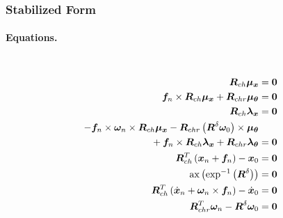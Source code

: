 \documentclass[10pt,fleqn,subeqn]{report}
\newcommand{\T}[1]{\bm{#1}}
\newcommand{\TT}[1]{\bm{#1}}
\begin{document}
\subsubsection{Stabilized Form}
\paragraph{Equations.} \
\begin{subequations}
\begin{align}
	\TT{R}_{ch} \T{\mu}_{\T{x}} &= \T{0} \\
%
	\T{f}_n \times \TT{R}_{ch} \T{\mu}_{\T{x}} + \TT{R}_{chr} \T{\mu}_{\T{\theta}} &= \T{0} \\
%
	\TT{R}_{ch} \T{\lambda}_{\T{x}} &= \T{0} \\
%
	-\T{f}_n \times \T{\omega}_n \times \TT{R}_{ch} \T{\mu}_{\T{x}}
	- \TT{R}_{chr} \plbr{\TT{R}^{\delta} \T{\omega}_0} \times \T{\mu}_{\T{\theta}} & \nonumber \\
	\mbox{} + \T{f}_n \times \TT{R}_{ch} \T{\lambda}_{\T{x}} + \TT{R}_{chr} \T{\lambda}_{\T{\theta}} &= \T{0} \\
%
	\TT{R}_{ch}^T\plbr{\T{x}_n + \T{f}_n} - \T{x}_0 &= \T{0} \\
%
	\mathrm{ax}\plbr{
		\mathrm{exp}^{-1}\plbr{
			\TT{R}^{\delta}
		}
	} &= \T{0} \\
%
	\TT{R}_{ch}^T\plbr{\dot{\T{x}}_n + \T{\omega}_n \times \T{f}_n} -\dot{\T{x}}_0 &= \T{0} \\
%
	\TT{R}_{chr}^T \T{\omega}_n - \TT{R}^{\delta} \T{\omega}_0 &= \T{0}
\end{align}
\end{subequations}
\end{document}
